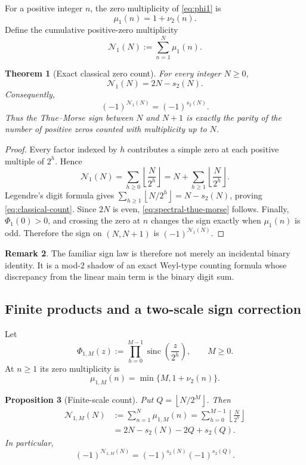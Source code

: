 \documentclass[11pt,a4paper]{article}
\theoremstyle{frontier}
\newtheorem{theorem}{Theorem}[section]
\newtheorem{proposition}[theorem]{Proposition}
\theoremstyle{definition}
\newtheorem{remark}[theorem]{Remark}
\newcommand{\sinc}{\operatorname{sinc}}
\newcommand{\floor}[1]{\left\lfloor #1\right\rfloor}
\begin{document}
For a positive integer $n$, the zero multiplicity of \eqref{eq:phi1} is
\[
  \mu_1(n)=1+\nu_2(n).
\]
Define the cumulative positive-zero multiplicity
\[
  \mathcal N_1(N):=\sum_{n=1}^{N}\mu_1(n).
\]

\begin{theorem}[Exact classical zero count]\label{thm:classical-count}
For every integer $N\ge0$,
\begin{equation}\label{eq:classical-count}
  \mathcal N_1(N)=2N-s_2(N).
\end{equation}
Consequently,
\begin{equation}\label{eq:spectral-thue-morse}
  (-1)^{\mathcal N_1(N)}=(-1)^{s_2(N)}.
\end{equation}
Thus the Thue--Morse sign between $N$ and $N+1$ is exactly the parity of the number of positive zeros counted with multiplicity up to $N$.
\end{theorem}

\begin{proof}
Every factor indexed by $h$ contributes a simple zero at each positive multiple of $2^h$.  Hence
\[
 \mathcal N_1(N)=\sum_{h\ge0}\floor{\frac N{2^h}}
 =N+\sum_{h\ge1}\floor{\frac N{2^h}}.
\]
Legendre's digit formula gives $\sum_{h\ge1}\floor{N/2^h}=N-s_2(N)$, proving \eqref{eq:classical-count}.  Since $2N$ is even, \eqref{eq:spectral-thue-morse} follows.  Finally, $\Phi_1(0)>0$, and crossing the zero at $n$ changes the sign exactly when $\mu_1(n)$ is odd.  Therefore the sign on $(N,N+1)$ is $(-1)^{\mathcal N_1(N)}$.
\end{proof}

\begin{remark}
The familiar sign law is therefore not merely an incidental binary identity.  It is a mod-$2$ shadow of an exact Weyl-type counting formula whose discrepancy from the linear main term is the binary digit sum.
\end{remark}

\subsection{Finite products and a two-scale sign correction}

Let
\[
  \Phi_{1,M}(z):=\prod_{h=0}^{M-1}\sinc\!\left(\frac z{2^h}\right),
  \qquad M\ge0.
\]
At $n\ge1$ its zero multiplicity is
\[
  \mu_{1,M}(n)=\min\{M,1+\nu_2(n)\}.
\]

\begin{proposition}[Finite-scale count]\label{prop:finite-classical}
Put $Q=\floor{N/2^M}$.  Then
\begin{align}
 \mathcal N_{1,M}(N)
 &:=\sum_{n=1}^{N}\mu_{1,M}(n)
   =\sum_{h=0}^{M-1}\floor{\frac N{2^h}}\label{eq:finite-count-floor}\\
 &=2N-s_2(N)-2Q+s_2(Q).\label{eq:finite-count-digital}
\end{align}
In particular,
\begin{equation}\label{eq:finite-sign}
  (-1)^{\mathcal N_{1,M}(N)}
  =(-1)^{s_2(N)}(-1)^{s_2(Q)}.
\end{equation}
\end{proposition}
\end{document}
